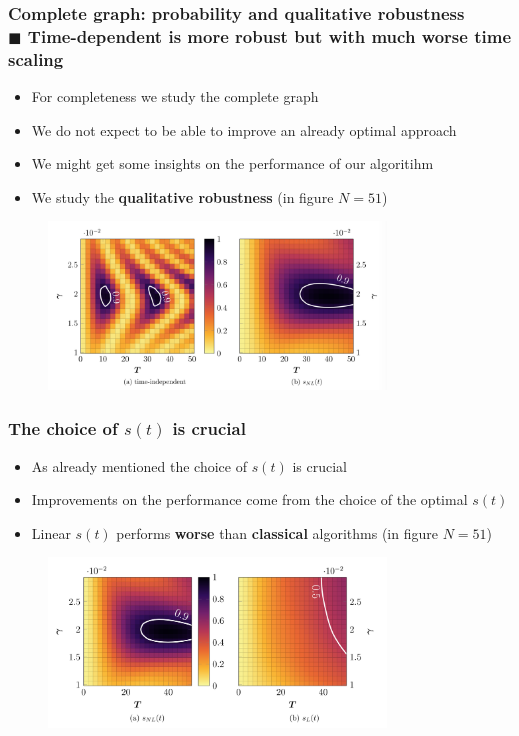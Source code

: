 \documentclass{beamer}
\newcommand{\bb}[1]{\textbf{\textcolor{darkish_blue}{#1}}}
\begin{document}
\begin{frame}
\frametitle{Complete graph: probability and qualitative robustness \\ \normalsize $\blacksquare$ Time-dependent is more robust but with much worse time scaling}

\begin{itemize}
	\item For completeness we study the complete graph
	\item We do not expect to be able to improve an already optimal approach
	\item We might get some insights on the performance of our algoritihm 
	\item We study the \bb{qualitative robustness} (in figure $N=51$)
\end{itemize}

\begin{figure}
	\centering
	\includegraphics[width=0.8\textwidth]{complete_heatmap.png}	
\end{figure}

\end{frame}


\begin{frame}
\frametitle{The choice of $s(t)$ is crucial}

\begin{itemize}
	\item As already mentioned the choice of $s(t)$ is crucial
	\item Improvements on the performance come from the choice of the optimal $s(t)$ 
	\item Linear $s(t)$ performs \bb{worse} than \bb{classical} algorithms (in figure $N=51$)
\end{itemize}

\begin{figure}
	\centering
	\includegraphics[width=0.8\textwidth]{complete_heatmap_time_dependent.png}
\end{figure}
\end{frame}
\end{document}
